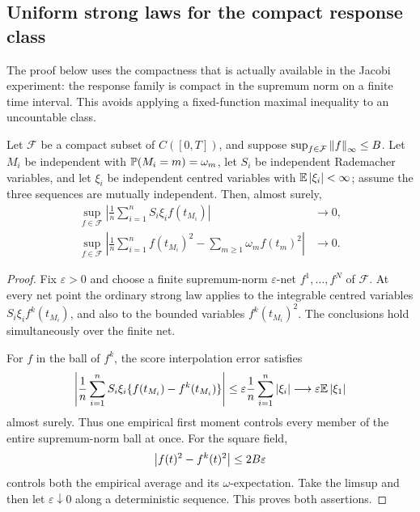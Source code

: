 \subsection{Uniform strong laws for the compact response class}

The proof below uses the compactness that is actually available in the
Jacobi experiment: the response family is compact in the supremum norm on a
finite time interval.  This avoids applying a fixed-function maximal
inequality to an uncountable class.

\begin{lemma}
\label{lem:supnorm-response-slln}
Let \(\mathcal F\) be a compact subset of \(C([0,T])\), and suppose
\(\sup_{f\in\mathcal F}\left\|f\right\|_\infty\le B\).  Let \(M_i\) be independent
with \(\mathbb P(M_i=m)=\omega_m\), let \(S_i\) be independent Rademacher
variables, and let \(\xi_i\) be independent centred variables with
\(\mathbb E\left|\xi_i\right|<\infty\); assume the three sequences are mutually
independent.  Then, almost surely,
\begin{align}
 \sup_{f\in\mathcal F}
 \left|\frac1n\sum_{i=1}^nS_i\xi_i f(t_{M_i})\right|&\longrightarrow0,
 \label{eq:supnorm-score-slln}\\
 \sup_{f\in\mathcal F}
 \left|\frac1n\sum_{i=1}^nf(t_{M_i})^2
       -\sum_{m\ge1}\omega_m f(t_m)^2\right|&\longrightarrow0.
 \label{eq:supnorm-square-slln}
\end{align}
\end{lemma}

\begin{proof}
Fix \(\varepsilon>0\) and choose a finite supremum-norm
\(\varepsilon\)-net \(f^1,\ldots,f^N\) of \(\mathcal F\).  At every net
point the ordinary strong law applies to the integrable centred variables
\(S_i\xi_if^k(t_{M_i})\), and also to the bounded variables
\(f^k(t_{M_i})^2\).  The conclusions hold simultaneously over the finite
net.

For \(f\) in the ball of \(f^k\), the score interpolation error satisfies
\[
 \left|\frac1n\sum_{i=1}^nS_i\xi_i
       \{f(t_{M_i})-f^k(t_{M_i})\}\right|
 \le \varepsilon\frac1n\sum_{i=1}^n\left|\xi_i\right|
 \longrightarrow\varepsilon\mathbb E\left|\xi_1\right|
\]
almost surely.  Thus one empirical first moment controls every member of the
entire supremum-norm ball at once.  For the square field,
\[
 \left|f(t)^2-f^k(t)^2\right|\le2B\varepsilon
\]
controls both the empirical average and its \(\omega\)-expectation.  Take the
limsup and then let \(\varepsilon\downarrow0\) along a deterministic
sequence.  This proves both assertions.
\end{proof}

